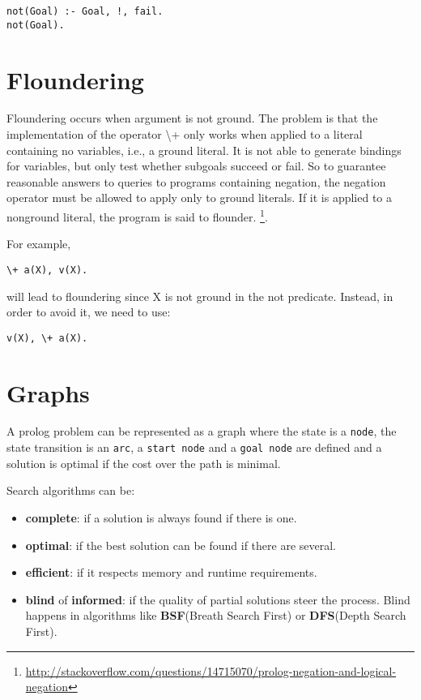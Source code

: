 \documentclass[12pt, oneside]{report}
\numberwithin{definition}{chapter}
\numberwithin{theorem}{chapter}
\numberwithin{lemma}{chapter}
\numberwithin{Rule}{chapter}
\numberwithin{equation}{chapter}
\begin{document}
\begin{verbatim}
not(Goal) :- Goal, !, fail.
not(Goal).

\end{verbatim}

\section{Floundering}
Floundering occurs when argument is not ground.
The problem is that the implementation of the operator \textbackslash+ only works when applied to a literal containing no variables, i.e., a ground literal. It is not able to generate bindings for variables, but only test whether subgoals succeed or fail. So to guarantee reasonable answers to queries to programs containing negation, the negation operator must be allowed to apply only to ground literals. If it is applied to a nonground literal, the program is said to flounder. \footnote{\url{http://stackoverflow.com/questions/14715070/prolog-negation-and-logical-negation}}.

For example, 

\begin{verbatim}
\+ a(X), v(X).
\end{verbatim}

will lead to floundering since X is not ground in the not predicate. Instead, in order to avoid it, we need to use:

\begin{verbatim}
v(X), \+ a(X).
\end{verbatim}

\section{Graphs}
A prolog problem can be represented as a graph where the state is a \texttt{node}, the state transition is an \texttt{arc}, a \texttt{start node} and a \texttt{goal node} are defined and a solution is optimal if the cost over the path is minimal.

Search algorithms can be:
\begin{itemize}
\item \textbf{complete}: if a solution is always found if there is one.
\item \textbf{optimal}: if the best solution can be found if there are several.
\item \textbf{efficient}: if it respects memory and runtime requirements.
\item \textbf{blind} of \textbf{informed}: if the quality of partial solutions steer the process. Blind happens in algorithms like \textbf{BSF}(Breath Search First) or \textbf{DFS}(Depth Search First).
\end{itemize}
\end{document}
